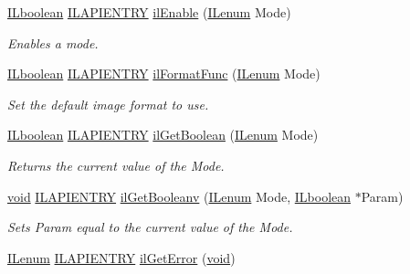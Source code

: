 \begin{DoxyCompactItemize}
\hyperlink{group__il__types_gaa6aa7c95cfdc06b4d8601ef832b7bb0a}{I\+Lboolean} \hyperlink{_i_l_8h_a69c08a8d06df986f7e46f209d131ef2f}{I\+L\+A\+P\+I\+E\+N\+T\+R\+Y} \hyperlink{group__state_gafa976322d840e3ffa8e0076ecff51b2b}{il\+Enable} (\hyperlink{group__il__types_ga62ca73445716183ef42b1f3906a45ed0}{I\+Lenum} Mode)
\begin{DoxyCompactList}\small\item\em Enables a mode. \end{DoxyCompactList}\item 
\hyperlink{group__il__types_gaa6aa7c95cfdc06b4d8601ef832b7bb0a}{I\+Lboolean} \hyperlink{_i_l_8h_a69c08a8d06df986f7e46f209d131ef2f}{I\+L\+A\+P\+I\+E\+N\+T\+R\+Y} \hyperlink{group__state_gacc97a458c5ba4562e32f0e8c446b3106}{il\+Format\+Func} (\hyperlink{group__il__types_ga62ca73445716183ef42b1f3906a45ed0}{I\+Lenum} Mode)
\begin{DoxyCompactList}\small\item\em Set the default image format to use. \end{DoxyCompactList}\item 
\hyperlink{group__il__types_gaa6aa7c95cfdc06b4d8601ef832b7bb0a}{I\+Lboolean} \hyperlink{_i_l_8h_a69c08a8d06df986f7e46f209d131ef2f}{I\+L\+A\+P\+I\+E\+N\+T\+R\+Y} \hyperlink{group__state_ga57d539fb2bdaacd8c6eec5d7e732e6e3}{il\+Get\+Boolean} (\hyperlink{group__il__types_ga62ca73445716183ef42b1f3906a45ed0}{I\+Lenum} Mode)
\begin{DoxyCompactList}\small\item\em Returns the current value of the {\itshape Mode}. \end{DoxyCompactList}\item 
\hyperlink{_i_l_8h_a5530e04d947bcddd83639ea7940faf10}{void} \hyperlink{_i_l_8h_a69c08a8d06df986f7e46f209d131ef2f}{I\+L\+A\+P\+I\+E\+N\+T\+R\+Y} \hyperlink{group__state_ga4f52565d3e790d84e8a42b143446383e}{il\+Get\+Booleanv} (\hyperlink{group__il__types_ga62ca73445716183ef42b1f3906a45ed0}{I\+Lenum} Mode, \hyperlink{group__il__types_gaa6aa7c95cfdc06b4d8601ef832b7bb0a}{I\+Lboolean} $\ast$Param)
\begin{DoxyCompactList}\small\item\em Sets {\itshape Param} equal to the current value of the {\itshape Mode}. \end{DoxyCompactList}\item 
\hyperlink{group__il__types_ga62ca73445716183ef42b1f3906a45ed0}{I\+Lenum} \hyperlink{_i_l_8h_a69c08a8d06df986f7e46f209d131ef2f}{I\+L\+A\+P\+I\+E\+N\+T\+R\+Y} \hyperlink{group__state_ga6a4486f21a6ee2812033aeda6c4b320e}{il\+Get\+Error} (\hyperlink{_i_l_8h_a5530e04d947bcddd83639ea7940faf10}{void})

\end{DoxyCompactItemize}

